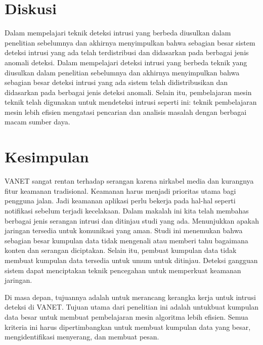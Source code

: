 \documentclass[conference]{IEEEtran}
\begin{document}
\section{Diskusi}
Dalam mempelajari teknik deteksi intrusi yang berbeda
diusulkan dalam penelitian sebelumnya dan akhirnya menyimpulkan bahwa
sebagian besar sistem deteksi intrusi yang ada telah
terdistribusi dan didasarkan pada berbagai jenis anomali
deteksi. Dalam mempelajari deteksi intrusi yang berbeda
teknik yang diusulkan dalam penelitian sebelumnya dan akhirnya
menyimpulkan bahwa sebagian besar deteksi intrusi yang ada
sistem telah didistribusikan dan didasarkan pada berbagai
jenis deteksi anomali. Selain itu, pembelajaran mesin
teknik telah digunakan untuk mendeteksi intrusi seperti ini:
teknik pembelajaran mesin lebih efisien mengatasi
pencarian dan analisis masalah dengan berbagai macam sumber daya.

\section{Kesimpulan}
VANET sangat rentan terhadap serangan karena nirkabel
media dan kurangnya fitur keamanan tradisional. Keamanan
harus menjadi prioritas utama bagi pengguna jalan. Jadi keamanan
aplikasi perlu bekerja pada hal-hal seperti notifikasi
sebelum terjadi kecelakaan. Dalam makalah ini kita telah membahas
berbagai jenis serangan intrusi dan ditinjau
studi yang ada. Menunjukkan apakah jaringan tersedia
untuk komunikasi yang aman. Studi ini menemukan bahwa sebagian besar
kumpulan data tidak mengenali atau memberi tahu bagaimana konten dan serangan
diciptakan. Selain itu, pembuat kumpulan data tidak membuat
kumpulan data tersedia untuk umum untuk ditinjau. Deteksi gangguan
sistem dapat menciptakan teknik pencegahan untuk memperkuat
keamanan jaringan.

Di masa depan, tujuannya adalah untuk merancang kerangka kerja untuk intrusi
deteksi di VANET. Tujuan utama dari penelitian ini adalah untukbuat kumpulan data besar untuk membuat pembelajaran mesin
algoritma lebih efisien. Semua kriteria ini harus
dipertimbangkan untuk membuat kumpulan data yang besar, mengidentifikasi
menyerang, dan membuat pesan.



\end{document}
